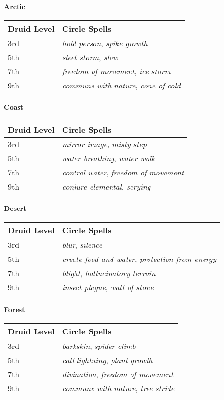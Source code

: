 \documentclass[
]{article}
\begin{document}
\hypertarget{arctic}{%
\paragraph{Arctic}\label{arctic}}

\begin{longtable}[]{@{}ll@{}}
\toprule
Druid Level & Circle Spells\tabularnewline
\midrule
\endhead
3rd & \emph{hold person}, \emph{spike growth}\tabularnewline
5th & \emph{sleet storm}, \emph{slow}\tabularnewline
7th & \emph{freedom of movement}, \emph{ice storm}\tabularnewline
9th & \emph{commune with nature}, \emph{cone of cold}\tabularnewline
\bottomrule
\end{longtable}

\hypertarget{coast}{%
\paragraph{Coast}\label{coast}}

\begin{longtable}[]{@{}ll@{}}
\toprule
Druid Level & Circle Spells\tabularnewline
\midrule
\endhead
3rd & \emph{mirror image,} \emph{misty step}\tabularnewline
5th & \emph{water breathing}, \emph{water walk}\tabularnewline
7th & \emph{control water}, \emph{freedom of movement}\tabularnewline
9th & \emph{conjure elemental}, \emph{scrying}\tabularnewline
\bottomrule
\end{longtable}

\hypertarget{desert}{%
\paragraph{Desert}\label{desert}}

\begin{longtable}[]{@{}ll@{}}
\toprule
Druid Level & Circle Spells\tabularnewline
\midrule
\endhead
3rd & \emph{blur}, \emph{silence}\tabularnewline
5th & \emph{create food and water}, \emph{protection from
energy}\tabularnewline
7th & \emph{blight}, \emph{hallucinatory terrain}\tabularnewline
9th & \emph{insect plague}, \emph{wall of stone}\tabularnewline
\bottomrule
\end{longtable}

\hypertarget{forest}{%
\paragraph{Forest}\label{forest}}

\begin{longtable}[]{@{}ll@{}}
\toprule
Druid Level & Circle Spells\tabularnewline
\midrule
\endhead
3rd & \emph{barkskin}, \emph{spider climb}\tabularnewline
5th & \emph{call lightning}, \emph{plant growth}\tabularnewline
7th & \emph{divination}, \emph{freedom of movement}\tabularnewline
9th & \emph{commune with nature}, \emph{tree stride}\tabularnewline
\bottomrule
\end{longtable}
\end{document}
